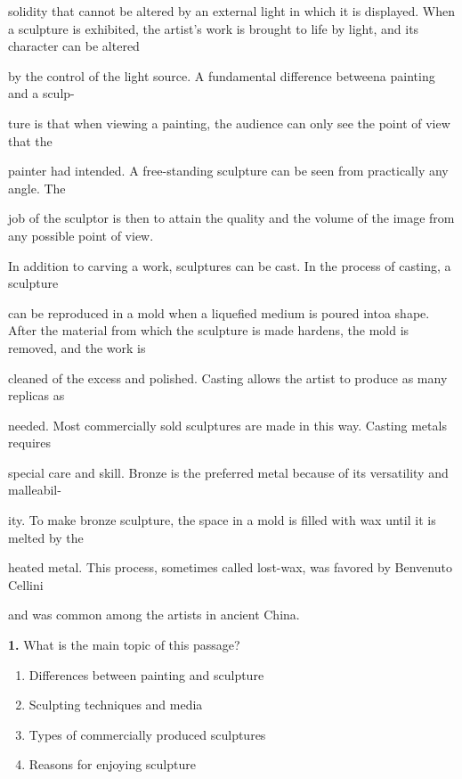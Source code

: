 \documentclass[12pt]{article}
\begin{document}
solidity that cannot be altered by an external light in which it is displayed. When a sculpture is exhibited, the artist's work is brought to life by light, and its character can be altered\par
by the control of the light source. A fundamental difference betweena painting and a sculp-\par
ture is that when viewing a painting, the audience can only see the point of view that the\par
painter had intended. A free-standing sculpture can be seen from practically any angle. The\par
job of the sculptor is then to attain the quality and the volume of the image from any possible point of view.\par
In addition to carving a work, sculptures can be cast. In the process of casting, a sculpture\par
can be reproduced in a mold when a liquefied medium is poured intoa shape. After the material from which the sculpture is made hardens, the mold is removed, and the work is\par
cleaned of the excess and polished. Casting allows the artist to produce as many replicas as\par
needed. Most commercially sold sculptures are made in this way. Casting metals requires\par
special care and skill. Bronze is the preferred metal because of its versatility and malleabil-\par
ity. To make bronze sculpture, the space in a mold is filled with wax until it is melted by the\par
heated metal. This process, sometimes called lost-wax, was favored by Benvenuto Cellini\par
and was common among the artists in ancient China.\par
\endgroup
\medskip
\noindent\textbf{1.} What is the main topic of this passage?
\begin{enumerate}[label=(\Alph*),leftmargin=*,itemsep=0.2em]
\item Differences between painting and sculpture
\item Sculpting techniques and media
\item Types of commercially produced sculptures
\item Reasons for enjoying sculpture
\end{enumerate}
\par
\begingroup
\setlength{\parskip}{0pt}
\setlength{\parindent}{0pt}
\end{document}

